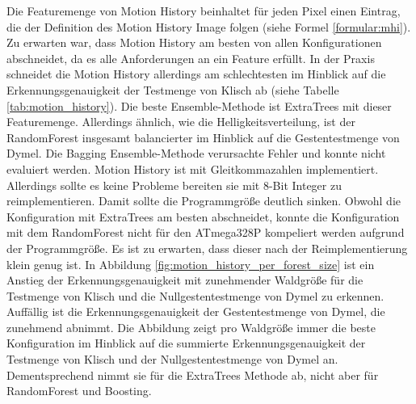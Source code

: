 Die Featuremenge von Motion History beinhaltet für jeden Pixel einen Eintrag, die der Definition des Motion History Image folgen (siehe Formel \ref{formular:mhi}).
\newline
\newline
Zu erwarten war, dass Motion History am besten von allen Konfigurationen abschneidet, da es alle Anforderungen an ein Feature erfüllt. In der Praxis schneidet die Motion History allerdings am schlechtesten
im Hinblick auf die Erkennungsgenauigkeit der Testmenge von Klisch ab (siehe Tabelle \ref{tab:motion_history}). Die beste Ensemble-Methode ist ExtraTrees mit dieser Featuremenge. Allerdings ähnlich, wie die
Helligkeitsverteilung, ist der RandomForest insgesamt balancierter im Hinblick auf die Gestentestmenge von Dymel. Die Bagging Ensemble-Methode verursachte Fehler und konnte nicht evaluiert werden.
\newline
\newline
Motion History ist mit Gleitkommazahlen implementiert. Allerdings sollte es keine Probleme bereiten sie mit 8-Bit Integer zu reimplementieren. Damit sollte die Programmgröße deutlich sinken. Obwohl die
Konfiguration mit ExtraTrees am besten abschneidet, konnte die Konfiguration mit dem RandomForest nicht für den ATmega328P kompeliert werden aufgrund der Programmgröße. Es ist zu erwarten, dass dieser nach
der Reimplementierung klein genug ist.
\newline
\newline
In Abbildung \ref{fig:motion_history_per_forest_size} ist ein Anstieg der Erkennungsgenauigkeit mit zunehmender Waldgröße für die Testmenge von Klisch und die Nullgestentestmenge von Dymel zu erkennen. Auffällig ist
die Erkennungsgenauigkeit der Gestentestmenge von Dymel, die zunehmend abnimmt. Die Abbildung zeigt pro Waldgröße immer die beste Konfiguration im Hinblick auf die summierte Erkennungsgenauigkeit der
Testmenge von Klisch und der Nullgestentestmenge von Dymel an. Dementsprechend nimmt sie für die ExtraTrees Methode ab, nicht aber für RandomForest und Boosting.

